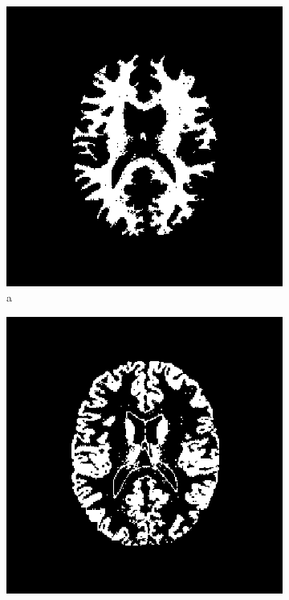 \begin{figure}[H]
	\centering
	\begin{subfigure}[b]{0.25\linewidth}
		\includegraphics[width=\linewidth]{figures/Module_09/m09_8}
		\caption{a}
	\end{subfigure}
		\begin{subfigure}[b]{0.25\linewidth}
		\includegraphics[width=\linewidth]{figures/Module_09/m09_10}

\end{subfigure}
\end{figure}
